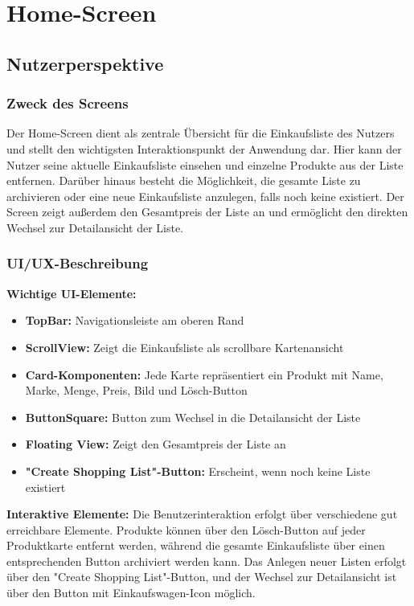 \section{Home-Screen}
\label{sec:home_screen}

\subsection{Nutzerperspektive}

\subsubsection{Zweck des Screens}
Der Home-Screen dient als zentrale Übersicht für die Einkaufsliste des Nutzers und stellt den wichtigsten Interaktionspunkt der Anwendung dar. Hier kann der Nutzer seine aktuelle Einkaufsliste einsehen und einzelne Produkte aus der Liste entfernen. Darüber hinaus besteht die Möglichkeit, die gesamte Liste zu archivieren oder eine neue Einkaufsliste anzulegen, falls noch keine existiert. Der Screen zeigt außerdem den Gesamtpreis der Liste an und ermöglicht den direkten Wechsel zur Detailansicht der Liste.

\subsubsection{UI/UX-Beschreibung}

\textbf{Wichtige UI-Elemente:}
\begin{itemize}
    \item \textbf{TopBar:} Navigationsleiste am oberen Rand
    \item \textbf{ScrollView:} Zeigt die Einkaufsliste als scrollbare Kartenansicht
    \item \textbf{Card-Komponenten:} Jede Karte repräsentiert ein Produkt mit Name, Marke, Menge, Preis, Bild und Lösch-Button
    \item \textbf{ButtonSquare:} Button zum Wechsel in die Detailansicht der Liste
    \item \textbf{Floating View:} Zeigt den Gesamtpreis der Liste an
    \item \textbf{"Create Shopping List"-Button:} Erscheint, wenn noch keine Liste existiert
\end{itemize}

\noindent\textbf{Interaktive Elemente:}
Die Benutzerinteraktion erfolgt über verschiedene gut erreichbare Elemente. Produkte können über den Lösch-Button auf jeder Produktkarte entfernt werden, während die gesamte Einkaufsliste über einen entsprechenden Button archiviert werden kann. Das Anlegen neuer Listen erfolgt über den "Create Shopping List"-Button, und der Wechsel zur Detailansicht ist über den Button mit Einkaufswagen-Icon möglich.

